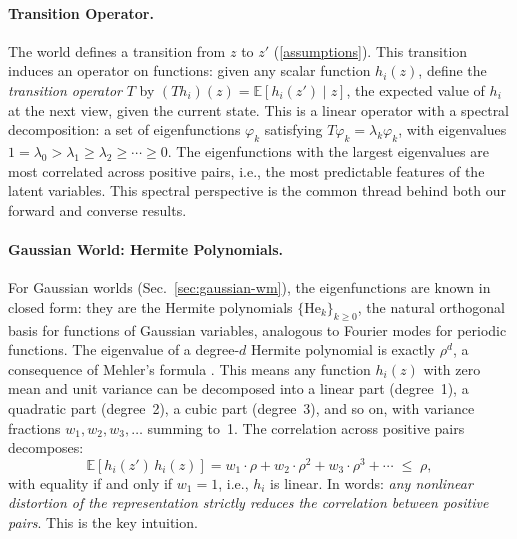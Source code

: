 \documentclass{article}
\begin{document}
\paragraph{Transition Operator.}
The world defines a transition from $z$ to $z'$ (\ref{assumptions}).
This transition induces an operator on functions: given any scalar function $h_i(z)$, define the \textit{transition operator} $T$ by $(Th_i)(z) = \mathbb{E}[h_i(z') \mid z]$, the expected value of $h_i$ at the next view, given the current state.
This is a linear operator with a spectral decomposition: a set of eigenfunctions $\varphi_k$ satisfying $T\varphi_k = \lambda_k \varphi_k$, with eigenvalues $1 = \lambda_0 > \lambda_1 \geq \lambda_2 \geq \cdots \geq 0$.
The eigenfunctions with the largest eigenvalues are most correlated across positive pairs, i.e., the most predictable features of the latent variables.
This spectral perspective is the common thread behind both our forward and converse results.

\paragraph{Gaussian World: Hermite Polynomials.}
For Gaussian worlds (Sec.~\ref{sec:gaussian-wm}), the eigenfunctions are known in closed form: they are the Hermite polynomials $\{\mathrm{He}_k\}_{k \geq 0}$, the natural orthogonal basis for functions of Gaussian variables, analogous to Fourier modes for periodic functions.
The eigenvalue of a degree-$d$ Hermite polynomial is exactly $\rho^d$, a consequence of Mehler's formula \citep{mehler1866}.
This means any function $h_i(z)$ with zero mean and unit variance can be decomposed into a linear part (degree~1), a quadratic part (degree~2), a cubic part (degree~3), and so on, with variance fractions $w_1, w_2, w_3, \ldots$ summing to~1.
The correlation across positive pairs decomposes:
\begin{equation}\label{eq:corr-decomp}
    \mathbb{E}\!\left[h_i(z')\, h_i(z)\right] = w_1 \cdot \rho + w_2 \cdot \rho^2 + w_3 \cdot \rho^3 + \cdots \;\leq\; \rho,
\end{equation}
with equality if and only if $w_1 = 1$, i.e., $h_i$ is linear.
In words: \textit{any nonlinear distortion of the representation strictly reduces the correlation between positive pairs}.
This is the key intuition.
\end{document}
